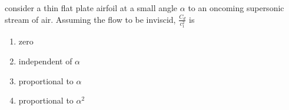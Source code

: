 \item consider a thin flat plate airfoil at a small angle $\alpha$ to an oncoming supersonic stream of air. Assuming the flow to be inviscid, $\frac{C_d}{c_1^2}$ is
\begin{enumerate}
    \item zero
    \item independent of $\alpha$
    \item proportional to $\alpha$
    \item proportional to $\alpha^2$ \\
\end{enumerate}

